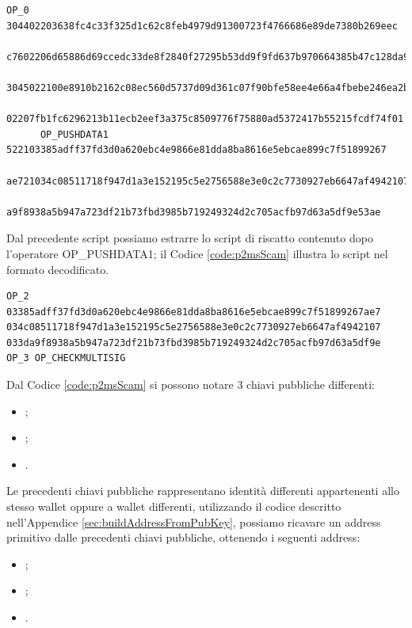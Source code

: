 \begin{example}
     \begin{lstlisting}[language=bitcoinscript, label={code:scritpSigScam}, caption={Script con cui è possibile eseguire con successo lo script illustrato attraverso il Codice \ref{code:scriptPubKeyScam}.}]
      OP_0 304402203638fc4c33f325d1c62c8feb4979d91300723f4766686e89de7380b269eec
        c7602206d65886d69ccedc33de8f2840f27295b53dd9f9fd637b970664385b47c128da901
        3045022100e8910b2162c08ec560d5737d09d361c07f90bfe58ee4e66a4fbebe246ea2b32c
        02207fb1fc6296213b11ecb2eef3a375c8509776f75880ad5372417b55215fcdf74f01
      OP_PUSHDATA1 522103385adff37fd3d0a620ebc4e9866e81dda8ba8616e5ebcae899c7f51899267
        ae721034c08511718f947d1a3e152195c5e2756588e3e0c2c7730927eb6647af494210721033d
        a9f8938a5b947a723df21b73fbd3985b719249324d2c705acfb97d63a5df9e53ae
     \end{lstlisting}

     Dal precedente script possiamo estrarre lo script di riscatto contenuto dopo l'operatore OP\_PUSHDATA1; il Codice \ref{code:p2msScam} illustra lo script nel formato decodificato.
     \begin{lstlisting}[language=bitcoinscript, label={code:p2msScam}, caption={Readme Script contenuto all'interno dello script di sblocco \ref{code:scritpSigScam}.}]
      OP_2 03385adff37fd3d0a620ebc4e9866e81dda8ba8616e5ebcae899c7f51899267ae7 034c08511718f947d1a3e152195c5e2756588e3e0c2c7730927eb6647af4942107 033da9f8938a5b947a723df21b73fbd3985b719249324d2c705acfb97d63a5df9e OP_3 OP_CHECKMULTISIG
    \end{lstlisting}
    Dal Codice \ref{code:p2msScam} si possono notare 3 chiavi pubbliche differenti:
    \begin{itemize}
      \item {};
      \item {};
      \item {}.
    \end{itemize}
    Le precedenti chiavi pubbliche rappresentano identità differenti appartenenti allo stesso wallet oppure a wallet differenti, utilizzando il codice descritto nell'Appendice \ref{sec:buildAddressFromPubKey}, possiamo ricavare un address primitivo dalle precedenti chiavi pubbliche, ottenendo i seguenti address:
    \begin{itemize}
      \item {};
      \item {};
      \item {}.
    \end{itemize}


\end{example}

